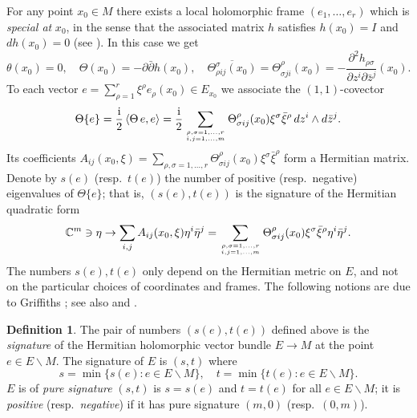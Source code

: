 \documentclass[11pt]{amsart}
\numberwithin{equation}{section}
\theoremstyle{definition}
\newtheorem{definition}[theorem]{Definition}
\begin{document}
For any point $x_0\in M$ there exists a local holomorphic frame 
$(e_1,\ldots,e_r)$ which is {\em special at} $x_0$, in the sense
that the associated matrix $h$ satisfies $h(x_0)=I$ and $dh(x_0)=0$
(see \cite[p.\ 195]{Griffiths69}). In this case we get
\begin{equation}
\label{eq:frame}
	\theta(x_0)=0,\quad \Theta(x_0)= -{\partial}{\bar\partial} h (x_0),\quad 
	\overline {\Theta^\sigma_{\rho i j} (x_0)} = \Theta^\rho_{\sigma j i}(x_0) =
	- \frac{{\partial}^2 h_{\rho \sigma}}{{\partial} z^i {\partial} \bar z^j} (x_0). 
\end{equation}
To each vector $e=\sum_{\rho=1}^r \xi^\rho e_\rho(x_0) \in E_{x_0}$
we associate the $(1,1)$-covector
\[
	\Theta\{e\}= \frac{\mathrm{i}}{2}\,  \langle \Theta \, e,e\rangle =
	\frac{\mathrm{i}}{2}
	\sum_{{\genfrac{}{}{0pt}{}{{\rho,\sigma=1,\ldots,r}}{{i,j=1,\ldots,m}}}} 
	      \Theta^\rho_{\sigma i j}(x_0) \xi^\sigma \bar \xi^\rho \, dz^i\wedge d\bar z^j.
\]
Its coefficients 
$
	A_{i j}(x_0,\xi) = \sum_{\rho,\sigma=1,\ldots,r} 
	      \Theta^\rho_{\sigma i j}(x_0) \xi^\sigma \bar \xi^\rho 
$
form a Hermitian matrix. Denote by $s(e)$ (resp.\ $t(e)$) 
the number of positive (resp.\ negative)
eigenvalues of $\Theta\{e\}$; that is, $(s(e),t(e))$ is the 
signature of the Hermitian quadratic form 
\begin{equation}
\label{curvature-form}
	{\mathbb{C}}^m\ni \eta \to \sum_{i,j} A_{i j}(x_0,\xi) \eta^i \bar \eta^j
	= \sum_{{\genfrac{}{}{0pt}{}{{\rho,\sigma=1,\ldots,r}}{{i,j=1,\ldots,m}}}} 
	      \Theta^\rho_{\sigma i j}(x_0) \xi^\sigma \bar \xi^\rho \eta^i\bar \eta^j.  
\end{equation}
The numbers $s(e), t(e)$ only depend on the Hermitian metric on $E$, 
and not on the particular choices of coordinates and frames. 
The following notions are due to 
Griffiths \cite{Griffiths65,Griffiths66,Griffiths69};
see also \cite{AG} and \cite[Chapter 7]{Dem-book}.

\begin{definition}
\label{Griffiths-positive}
The pair of numbers $(s(e),t(e))$ defined above 
is the {\em signature} of the Hermitian 
holomorphic vector bundle $E\to M$ at the point $e\in E{\backslash} M$. 
The signature of $E$ is $(s,t)$ where 
\[
	s=\min\{s(e)\colon e\in E{\backslash} M\},\quad t=\min\{t(e)\colon e\in E{\backslash} M\}.
\]	
$E$ is of {\em pure signature} $(s,t)$ is $s=s(e)$ and $t=t(e)$
for all $e\in E{\backslash} M$; it is {\em positive} (resp.\ {\em negative}) 
if it has pure signature $(m,0)$ (resp.\ $(0,m)$).
\end{definition}
\end{document}

